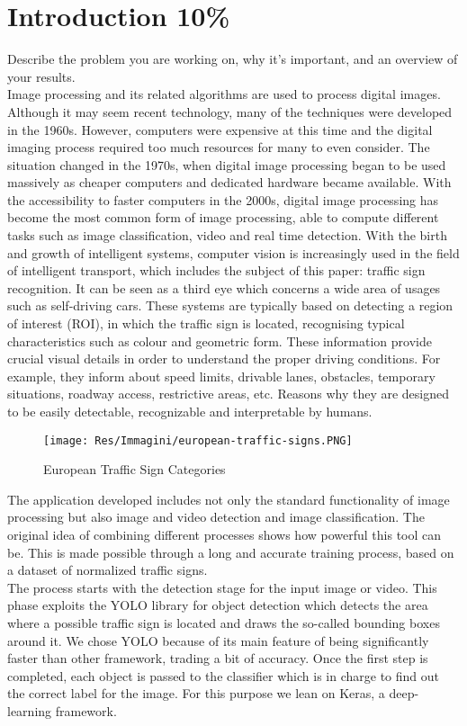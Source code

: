 \section{Introduction 10\%}
Describe the problem you are working on, why it's important, and an overview of your results.\\
Image processing and its related algorithms are used to process digital images. Although it may seem recent technology, many of the techniques were developed in the 1960s. However, computers were expensive at this time and the digital imaging process required too much resources for many to even consider. The situation changed in the 1970s, when digital image processing began to be used massively as cheaper computers and dedicated hardware became available. With the accessibility to faster computers in the 2000s, digital image processing has become the most common form of image processing, able to compute different tasks such as image classification, video and real time detection. With the birth and growth of intelligent systems, computer vision is increasingly used in the field of intelligent transport, which includes the subject of this paper: traffic sign recognition. It can be seen as a third eye which concerns a wide area of usages such as self-driving cars. These systems are typically based on detecting a region of interest (ROI), in which the traffic sign is located, recognising typical characteristics such as colour and geometric form. These information provide crucial visual details in order to understand the proper driving conditions. For example, they inform about speed limits, drivable lanes, obstacles, temporary situations, roadway access, restrictive areas, etc. Reasons why they are designed to be easily detectable, recognizable and interpretable by humans.
\begin{figure}[h]
	\texttt{[image: Res/Immagini/european-traffic-signs.PNG]}	
	\caption{European Traffic Sign Categories}
\end{figure}


The application developed includes not only the standard functionality of image processing but also image and video detection and image classification. The original idea of combining different processes shows how powerful this tool can be. This is made possible through a long and accurate training process, based on a dataset of normalized traffic signs.\\ The process starts with the detection stage for the input image or video. This phase exploits the YOLO library for object detection which detects the area where a possible traffic sign is located and draws the so-called bounding boxes around it. We chose YOLO because of its main feature of being significantly faster than other framework, trading a bit of accuracy. Once the first step is completed, each object is passed to the classifier which is in charge to find out the correct label for the image. For this purpose we lean on Keras, a deep-learning framework.
